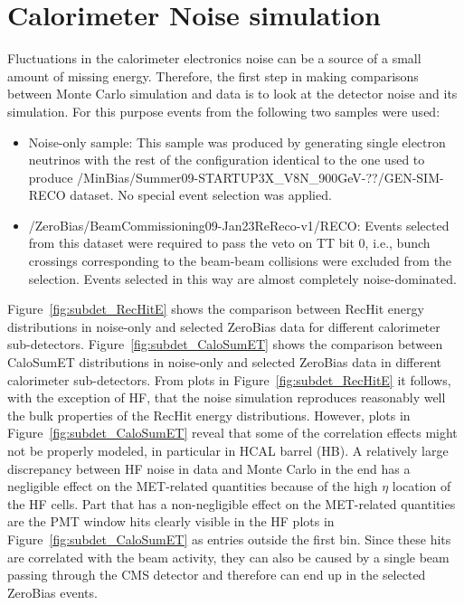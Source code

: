 \section{Calorimeter Noise simulation}
\label{sc:CaloNoise}

Fluctuations in the calorimeter electronics noise can be a source of a small amount of missing energy. Therefore, the first step
in making comparisons between Monte Carlo simulation and data is to look at the detector noise and its simulation. For this purpose
events from the following two samples were used:

\begin{itemize}
  \item Noise-only sample: \newline
This sample was produced by generating single electron neutrinos with the rest of the configuration identical to the one used to
produce /MinBias/Summer09-STARTUP3X\_V8N\_900GeV-??/GEN-SIM-RECO dataset. No special event selection was applied.

  \item /ZeroBias/BeamCommissioning09-Jan23ReReco-v1/RECO: \newline
Events selected from this dataset were required to pass the veto on TT bit 0, i.e., bunch crossings corresponding to the beam-beam
collisions were excluded from the selection. Events selected in this way are almost completely noise-dominated.
\end{itemize}

Figure~\ref{fig:subdet_RecHitE} shows the comparison between RecHit energy distributions in noise-only and selected ZeroBias data for different
calorimeter sub-detectors. Figure~\ref{fig:subdet_CaloSumET} shows the comparison between CaloSumET distributions in noise-only and selected 
ZeroBias data in different calorimeter sub-detectors. From plots in Figure~\ref{fig:subdet_RecHitE} it follows, with the exception of HF, that
the noise simulation reproduces reasonably well the bulk properties of the RecHit energy distributions. However, plots in 
Figure~\ref{fig:subdet_CaloSumET} reveal that some of the correlation effects might not be properly modeled, in particular in HCAL barrel (HB).
A relatively large discrepancy between HF noise in data and Monte Carlo in the end has a negligible effect on the MET-related quantities 
because of the high $\eta$ location of the HF cells. Part that has a non-negligible effect on the MET-related quantities are the PMT window hits
clearly visible in the HF plots in Figure~\ref{fig:subdet_CaloSumET} as entries outside the first bin. Since these
 hits are correlated with the beam activity, they can also be caused by a single beam passing through the CMS detector and therefore can end up
in the selected ZeroBias events.


